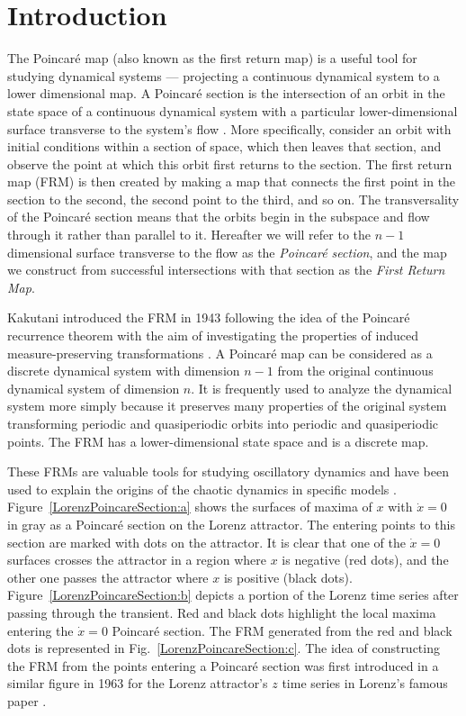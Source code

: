 \documentclass[%
 aip,
 amsmath,amssymb,
 reprint,%
]{revtex4-1}
\begin{document}
\section{\label{sec:level1}Introduction}

The Poincar\'e map (also known as the first return map) is a useful tool for studying dynamical systems --- projecting a continuous dynamical system to a lower dimensional map. A Poincar\'e section is the intersection of an orbit in the state space of a continuous dynamical system with a particular lower-dimensional surface transverse to the system's flow \cite{r33}. More specifically, consider an orbit with initial conditions within a section of space, which then leaves that section, and observe the point at which this orbit first returns to the section.
The first return map (FRM) is then created by making a map that connects the first point in the section to the second, the second point to the third, and so on. The transversality of the Poincar\'e section means that the orbits begin in the subspace and flow through it rather than parallel to it. Hereafter we will refer to the $n-1$ dimensional surface transverse to the flow as the {\em Poincar\'e section}, and the map we construct from successful intersections with that section as the {\em First Return Map}.

Kakutani introduced the FRM in 1943 following the idea of the Poincar\'e recurrence theorem with the aim of investigating the properties of induced measure-preserving transformations \cite{r31}. A Poincar\'e map can be considered as a discrete dynamical system with dimension $n-1$ from the original continuous dynamical system of dimension $n$. It is frequently used to analyze the dynamical system more simply because it preserves many properties of the original system transforming periodic and quasiperiodic orbits into periodic and quasiperiodic points. The FRM has a lower-dimensional state space and is a discrete map. 

These FRMs are valuable tools for studying oscillatory dynamics and have been used to explain the origins of the chaotic dynamics in specific models \cite{r18}. 
Figure~\ref{LorenzPoincareSection:a} shows the surfaces of maxima of $x$ with $\dot{x}=0$ in gray as a Poincar\'e section on the Lorenz attractor. The entering points to this section are marked with dots on the attractor.
It is clear that one of the $\dot{x}=0$ surfaces crosses the attractor in a region where $x$ is negative (red dots), and the other one passes the attractor where $x$ is positive (black dots).
Figure~\ref{LorenzPoincareSection:b} depicts a portion of the Lorenz time series after passing through the transient. Red and black dots highlight the local maxima entering the $\dot{x}=0$ Poincar\'e section. 
The FRM generated from the red and black dots is represented in Fig.~\ref{LorenzPoincareSection:c}. The idea of constructing the FRM from the points entering a Poincar\'e section was first introduced in a similar figure in 1963 for the Lorenz attractor's $z$ time series in Lorenz's famous paper \cite{r19}.
\end{document}
